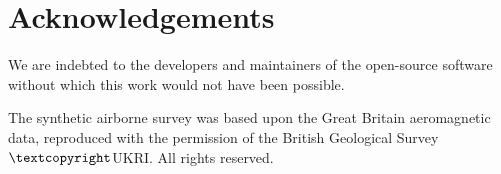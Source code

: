 \documentclass[twocolumn]{article}
\begin{document}

\section{Acknowledgements}

We are indebted to the developers and maintainers of the open-source software
without which this work would not have been possible.

The synthetic airborne survey was based upon the Great Britain aeromagnetic
data, reproduced with the permission of the British Geological Survey
$\textcopyright$UKRI\@.
All rights reserved.




\end{document}
